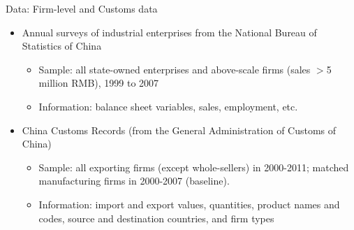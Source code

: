 \documentclass[10pt]{beamer}
\begin{document}
\begin{frame}{Data: Firm-level and Customs data}
    \begin{itemize}
	\item Annual surveys of industrial enterprises from the National Bureau of Statistics of China
	\begin{itemize}
		\item Sample: all state-owned enterprises and above-scale firms (sales $>$5 million RMB), 1999 to 2007 
            \item Information: balance sheet variables, sales, employment, etc.
	\end{itemize}
        \medskip
        \item China Customs Records (from the General Administration of Customs of China)
        \begin{itemize}
            \item Sample: all exporting firms (except whole-sellers) in 2000-2011; matched manufacturing firms in 2000-2007 (baseline).
            \item Information: import and export values, quantities, product names and codes, source and destination countries, and firm types
	\end{itemize}
    \end{itemize}
\end{frame}
\end{document}
